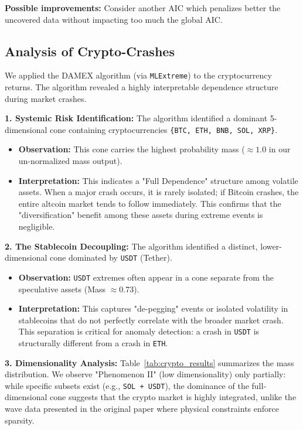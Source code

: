 \documentclass[11pt]{article}
\begin{document}
\textbf{Possible improvements:} Consider another AIC which penalizes better the uncovered data without impacting too much the global AIC. 



\subsection{Analysis of Crypto-Crashes}
We applied the DAMEX algorithm (via \texttt{MLExtreme}) to the cryptocurrency returns. The algorithm revealed a highly interpretable dependence structure during market crashes.

\textbf{1. Systemic Risk Identification:}
The algorithm identified a dominant 5-dimensional cone containing cryptocurrencies \texttt{\{BTC, ETH, BNB, SOL, XRP\}}.
\begin{itemize}
    \item \textbf{Observation:} This cone carries the highest probability mass ($\approx 1.0$ in our un-normalized mass output).
    \item \textbf{Interpretation:} This indicates a "Full Dependence" structure among volatile assets. When a major crash occurs, it is rarely isolated; if Bitcoin crashes, the entire altcoin market tends to follow immediately. This confirms that the "diversification" benefit among these assets during extreme events is negligible.
\end{itemize}

\textbf{2. The Stablecoin Decoupling:}
The algorithm identified a distinct, lower-dimensional cone dominated by \texttt{USDT} (Tether).
\begin{itemize}
    \item \textbf{Observation:} \texttt{USDT} extremes often appear in a cone separate from the speculative assets (Mass $\approx 0.73$).
    \item \textbf{Interpretation:} This captures "de-pegging" events or isolated volatility in stablecoins that do not perfectly correlate with the broader market crash. This separation is critical for anomaly detection: a crash in \texttt{USDT} is structurally different from a crash in \texttt{ETH}.
\end{itemize}

\textbf{3. Dimensionality Analysis:}
Table~\ref{tab:crypto_results} summarizes the mass distribution. We observe "Phenomenon II" (low dimensionality) only partially: while specific subsets exist (e.g., \texttt{SOL + USDT}), the dominance of the full-dimensional cone suggests that the crypto market is highly integrated, unlike the wave data presented in the original paper where physical constraints enforce sparsity.
\end{document}
